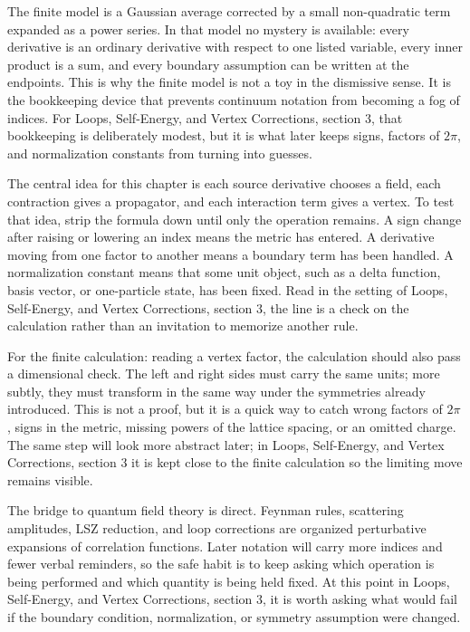 The finite model is a Gaussian average corrected by a small non-quadratic term expanded as a power series.  In that model no mystery is available: every derivative is an ordinary derivative with respect to one listed variable, every inner product is a sum, and every boundary assumption can be written at the endpoints.  This is why the finite model is not a toy in the dismissive sense.  It is the bookkeeping device that prevents continuum notation from becoming a fog of indices.  For Loops, Self-Energy, and Vertex Corrections, section 3, that bookkeeping is deliberately modest, but it is what later keeps signs, factors of \(2\pi\), and normalization constants from turning into guesses.

The central idea for this chapter is each source derivative chooses a field, each contraction gives a propagator, and each interaction term gives a vertex.  To test that idea, strip the formula down until only the operation remains.  A sign change after raising or lowering an index means the metric has entered.  A derivative moving from one factor to another means a boundary term has been handled.  A normalization constant means that some unit object, such as a delta function, basis vector, or one-particle state, has been fixed.  Read in the setting of Loops, Self-Energy, and Vertex Corrections, section 3, the line is a check on the calculation rather than an invitation to memorize another rule.

For the finite calculation: reading a vertex factor, the calculation should also pass a dimensional check.  The left and right sides must carry the same units; more subtly, they must transform in the same way under the symmetries already introduced.  This is not a proof, but it is a quick way to catch wrong factors of \(2\pi\), signs in the metric, missing powers of the lattice spacing, or an omitted charge.  The same step will look more abstract later; in Loops, Self-Energy, and Vertex Corrections, section 3 it is kept close to the finite calculation so the limiting move remains visible.

The bridge to quantum field theory is direct.  Feynman rules, scattering amplitudes, LSZ reduction, and loop corrections are organized perturbative expansions of correlation functions.  Later notation will carry more indices and fewer verbal reminders, so the safe habit is to keep asking which operation is being performed and which quantity is being held fixed.  At this point in Loops, Self-Energy, and Vertex Corrections, section 3, it is worth asking what would fail if the boundary condition, normalization, or symmetry assumption were changed.

